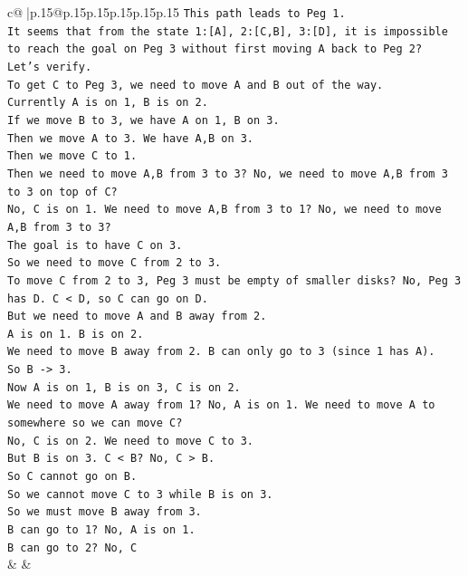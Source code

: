 \documentclass{article}
\begin{document}
{\begin{supertabular}{c@{$\;$}|p{.15\linewidth}@{}p{.15\linewidth}p{.15\linewidth}p{.15\linewidth}p{.15\linewidth}p{.15\linewidth}}
{{{\texttt{This path leads to Peg 1.} \\
\texttt{It seems that from the state 1:{[}A{]}, 2:{[}C,B{]}, 3:{[}D{]}, it is impossible to reach the goal on Peg 3 without first moving A back to Peg 2?} \\
\texttt{Let's verify.} \\
\texttt{To get C to Peg 3, we need to move A and B out of the way.} \\
\texttt{Currently A is on 1, B is on 2.} \\
\texttt{If we move B to 3, we have A on 1, B on 3.} \\
\texttt{Then we move A to 3. We have A,B on 3.} \\
\texttt{Then we move C to 1.} \\
\texttt{Then we need to move A,B from 3 to 3? No, we need to move A,B from 3 to 3 on top of C?} \\
\texttt{No, C is on 1. We need to move A,B from 3 to 1? No, we need to move A,B from 3 to 3?} \\
\texttt{The goal is to have C on 3.} \\
\texttt{So we need to move C from 2 to 3.} \\
\texttt{To move C from 2 to 3, Peg 3 must be empty of smaller disks? No, Peg 3 has D. C < D, so C can go on D.} \\
\texttt{But we need to move A and B away from 2.} \\
\texttt{A is on 1. B is on 2.} \\
\texttt{We need to move B away from 2. B can only go to 3 (since 1 has A).} \\
\texttt{So B {-}> 3.} \\
\texttt{Now A is on 1, B is on 3, C is on 2.} \\
\texttt{We need to move A away from 1? No, A is on 1. We need to move A to somewhere so we can move C?} \\
\texttt{No, C is on 2. We need to move C to 3.} \\
\texttt{But B is on 3. C < B? No, C > B.} \\
\texttt{So C cannot go on B.} \\
\texttt{So we cannot move C to 3 while B is on 3.} \\
\texttt{So we must move B away from 3.} \\
\texttt{B can go to 1? No, A is on 1.} \\
\texttt{B can go to 2? No, C} \\
            }
        }
    }
    & & \\ \\


\end{supertabular}}
\end{document}
